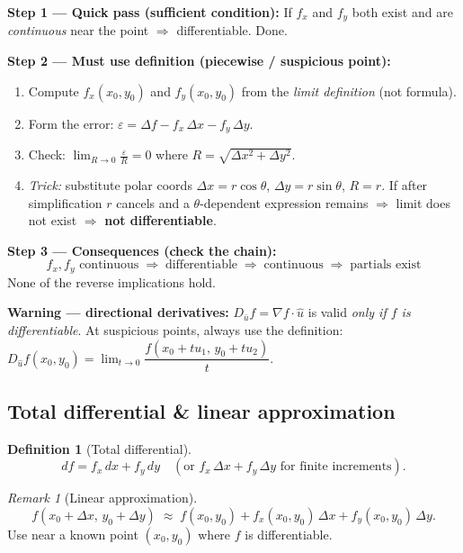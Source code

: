 \documentclass[12pt,a4paper]{article}
\theoremstyle{definition}
\newtheorem{definition}[theorem]{Definition}
\theoremstyle{remark}
\newtheorem{remark}[theorem]{Remark}
\begin{document}
\begin{tcolorbox}[title={How to check differentiability at $(x_0,y_0)$}, colback=blue!5, colframe=blue!40!black]
\textbf{Step 1 — Quick pass (sufficient condition):}
If $f_x$ and $f_y$ both exist and are \emph{continuous} near the point $\Rightarrow$ differentiable. Done.

\medskip
\textbf{Step 2 — Must use definition (piecewise / suspicious point):}
\begin{enumerate}
  \item Compute $f_x(x_0,y_0)$ and $f_y(x_0,y_0)$ from the \emph{limit definition} (not formula).
  \item Form the error: $\varepsilon = \Delta f - f_x\,\Delta x - f_y\,\Delta y$.
  \item Check: $\displaystyle\lim_{R\to 0}\frac{\varepsilon}{R} = 0$ where $R=\sqrt{\Delta x^2+\Delta y^2}$.
  \item \textit{Trick:} substitute polar coords $\Delta x = r\cos\theta$, $\Delta y=r\sin\theta$, $R=r$.
        If after simplification $r$ cancels and a $\theta$-dependent expression remains $\Rightarrow$ limit does not exist $\Rightarrow$ \textbf{not differentiable}.
\end{enumerate}

\medskip
\textbf{Step 3 — Consequences (check the chain):}
\[
  f_x,f_y \text{ continuous} \;\Rightarrow\; \text{differentiable} \;\Rightarrow\; \text{continuous} \;\Rightarrow\; \text{partials exist}
\]
None of the reverse implications hold.

\medskip
\textbf{Warning — directional derivatives:}
$D_{\bar{u}}f = \nabla f\cdot\hat{u}$ is valid \emph{only if $f$ is differentiable}.
At suspicious points, always use the definition:
$D_{\hat{u}}f(x_0,y_0) = \lim_{t\to 0}\dfrac{f(x_0+tu_1,\,y_0+tu_2)}{t}$.
\end{tcolorbox}

\subsection*{Total differential \& linear approximation}

\begin{definition}[Total differential]
\[
  df = f_x\,dx + f_y\,dy \quad (\text{or } f_x\,\Delta x + f_y\,\Delta y \text{ for finite increments}).
\]
\end{definition}

\begin{remark}[Linear approximation]
\[
  f(x_0+\Delta x,\,y_0+\Delta y)\;\approx\; f(x_0,y_0)+f_x(x_0,y_0)\,\Delta x+f_y(x_0,y_0)\,\Delta y.
\]
Use near a known point $(x_0,y_0)$ where $f$ is differentiable.
\end{remark}
\end{document}
